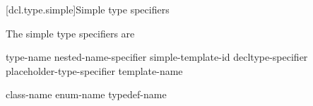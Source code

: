 [dcl.type.simple]{Simple type specifiers}%

\pnum
The simple type specifiers are
\begin{bnf}
\br
     type-name\br
    nested-name-specifier  simple-template-id\br
    decltype-specifier\br
    placeholder-type-specifier\br
     template-name\br
    \br
    \br
    \br
    \br
    \br
    \br
    \br
    \br
    \br
    \br
    \br
    \br
    \br
\end{bnf}

\begin{bnf}
\br
    class-name\br
    enum-name\br
    typedef-name
\end{bnf}

